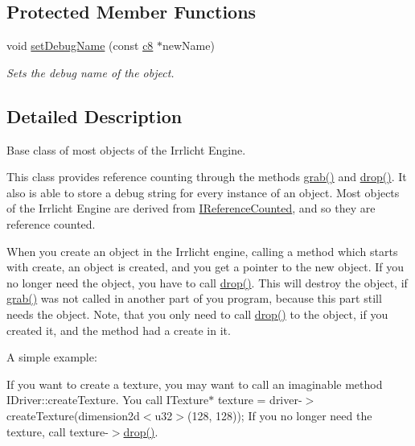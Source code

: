 \subsection*{Protected Member Functions}
\begin{DoxyCompactItemize}
\item 
void \hyperlink{classirr_1_1IReferenceCounted_a704c5042d399fe8cd3bdd65a0559002a}{set\+Debug\+Name} (const \hyperlink{namespaceirr_a9395eaea339bcb546b319e9c96bf7410}{c8} $\ast$new\+Name)
\begin{DoxyCompactList}\small\item\em Sets the debug name of the object. \end{DoxyCompactList}\end{DoxyCompactItemize}


\subsection{Detailed Description}
Base class of most objects of the Irrlicht Engine. 

This class provides reference counting through the methods \hyperlink{classirr_1_1IReferenceCounted_a2b7a035532e5f409ca9482dab79185f4}{grab()} and \hyperlink{classirr_1_1IReferenceCounted_afb169a857e0d2cdb96b8821cb9bff17a}{drop()}. It also is able to store a debug string for every instance of an object. Most objects of the Irrlicht Engine are derived from \hyperlink{classirr_1_1IReferenceCounted}{I\+Reference\+Counted}, and so they are reference counted.

When you create an object in the Irrlicht engine, calling a method which starts with \textquotesingle{}create\textquotesingle{}, an object is created, and you get a pointer to the new object. If you no longer need the object, you have to call \hyperlink{classirr_1_1IReferenceCounted_afb169a857e0d2cdb96b8821cb9bff17a}{drop()}. This will destroy the object, if \hyperlink{classirr_1_1IReferenceCounted_a2b7a035532e5f409ca9482dab79185f4}{grab()} was not called in another part of you program, because this part still needs the object. Note, that you only need to call \hyperlink{classirr_1_1IReferenceCounted_afb169a857e0d2cdb96b8821cb9bff17a}{drop()} to the object, if you created it, and the method had a \textquotesingle{}create\textquotesingle{} in it.

A simple example\+:

If you want to create a texture, you may want to call an imaginable method I\+Driver\+::create\+Texture. You call I\+Texture$\ast$ texture = driver-\/$>$create\+Texture(dimension2d$<$u32$>$(128, 128)); If you no longer need the texture, call texture-\/$>$\hyperlink{classirr_1_1IReferenceCounted_afb169a857e0d2cdb96b8821cb9bff17a}{drop()}.

